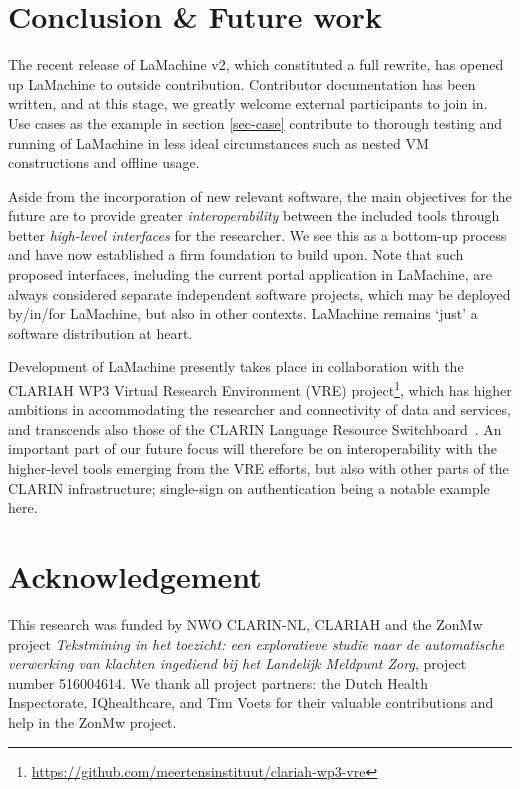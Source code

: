 \documentclass[a4paper,11pt]{article}
\begin{document}

\section{Conclusion \& Future work}

The recent release of LaMachine v2, which constituted a full rewrite, has opened up LaMachine to outside
contribution. Contributor documentation has been written, and at this stage, we greatly welcome external participants
to join in. Use cases as the example in section \ref{sec-case} contribute to thorough testing and running of LaMachine in less ideal circumstances such as nested VM constructions and offline usage.

Aside from the incorporation of new relevant software, the main objectives for the future are to provide
greater \emph{interoperability} between the included tools through better \emph{high-level interfaces} for the
researcher. We see this as a bottom-up process and have now established a firm foundation to build upon. Note that such
proposed interfaces, including the current portal application in LaMachine, are always considered separate independent
software projects, which may be deployed by/in/for LaMachine, but also in other contexts. LaMachine remains `just'
a software distribution at heart.

Development of LaMachine presently takes place in collaboration with the CLARIAH WP3 Virtual Research Environment (VRE)
project\footnote{\url{https://github.com/meertensinstituut/clariah-wp3-vre}}, which has higher ambitions in
accommodating the researcher and connectivity of data and services, and transcends also those of the CLARIN Language
Resource Switchboard~\cite{switchboard}. An important part of our future focus will therefore be on interoperability
with the higher-level tools emerging from the VRE efforts, but also with other parts of the CLARIN infrastructure;
single-sign on authentication being a notable example here.

\section*{Acknowledgement}

This research was funded by NWO CLARIN-NL, CLARIAH and the ZonMw project {\it Tekstmining in het toezicht: een exploratieve studie naar de automatische verwerking van klachten ingediend bij het Landelijk Meldpunt Zorg}, project number 516004614. We thank all project partners: the Dutch Health Inspectorate, IQhealthcare, and Tim Voets for their valuable contributions and help in the ZonMw project.



\end{document}
